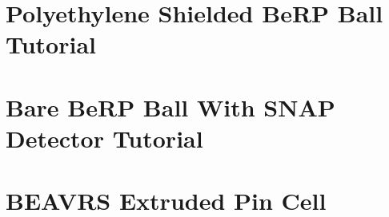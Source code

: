 

\section{Polyethylene Shielded BeRP Ball Tutorial}



\section{Bare BeRP Ball With SNAP Detector Tutorial}



\section{BEAVRS Extruded Pin Cell}


